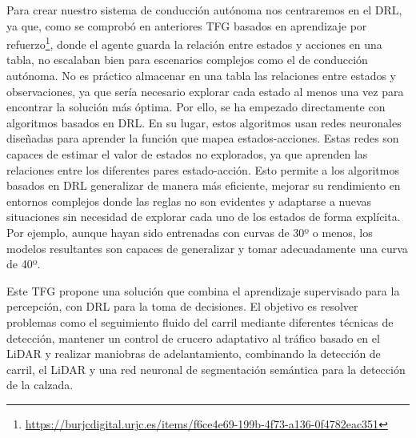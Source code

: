 Para crear nuestro sistema de conducción autónoma nos centraremos en el \ac{DRL}, ya que, como se comprobó en anteriores \ac{TFG} basados en aprendizaje por refuerzo\footnote{\url{https://burjcdigital.urjc.es/items/f6ce4e69-199b-4f73-a136-0f4782eac351}}, donde el agente guarda la relación entre estados y acciones en una tabla, no escalaban bien para escenarios complejos como el de conducción autónoma. No es práctico almacenar en una tabla las relaciones entre estados y observaciones, ya que sería necesario explorar cada estado al menos una vez para encontrar la solución más óptima. Por ello, se ha empezado directamente con algoritmos basados en \ac{DRL}. En su lugar, estos algoritmos usan redes neuronales diseñadas para aprender la función que mapea estados-acciones. Estas redes son capaces de estimar el valor de estados no explorados, ya que aprenden las relaciones entre los diferentes pares estado-acción. Esto permite a los algoritmos basados en \ac{DRL} generalizar de manera más eficiente, mejorar su rendimiento en entornos complejos donde las reglas no son evidentes y adaptarse a nuevas situaciones sin necesidad de explorar cada uno de los estados de forma explícita. Por ejemplo, aunque hayan sido entrenadas con curvas de 30º o menos, los modelos resultantes son capaces de generalizar y tomar adecuadamente una curva de 40º.

Este \ac{TFG} propone una solución que combina el aprendizaje supervisado para la percepción, con \ac{DRL} para la toma de decisiones. El objetivo es resolver problemas como el seguimiento fluido del carril mediante diferentes técnicas de detección, mantener un control de crucero adaptativo al tráfico basado en el \ac{LiDAR} y realizar maniobras de adelantamiento, combinando la detección de carril, el \ac{LiDAR} y una red neuronal de segmentación semántica para la detección de la calzada. 


